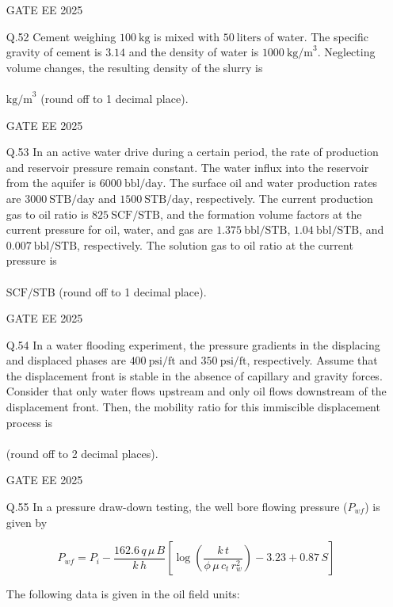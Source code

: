 \documentclass{article}
\begin{document}
\begin{enumerate}[leftmargin=*,series=q]
GATE EE 2025
\vspace{0.5cm}
\item[Q.52] Cement weighing $100 \ \text{kg}$ is mixed with $50 \ \text{liters}$ of water. The specific gravity of cement is $3.14$ and the density of water is $1000 \ \text{kg/m}^3$. Neglecting volume changes, the resulting density of the slurry is \\\\ $\text{kg/m}^3$ (round off to 1 decimal place).  

GATE EE 2025
\vspace{0.5cm}
\item[Q.53] In an active water drive during a certain period, the rate of production and reservoir pressure remain constant. The water influx into the reservoir from the aquifer is $6000 \ \text{bbl/day}$. The surface oil and water production rates are $3000 \ \text{STB/day}$ and $1500 \ \text{STB/day}$, respectively. The current production gas to oil ratio is $825 \ \text{SCF/STB}$, and the formation volume factors at the current pressure for oil, water, and gas are $1.375 \ \text{bbl/STB}$, $1.04 \ \text{bbl/STB}$, and $0.007 \ \text{bbl/STB}$, respectively. The solution gas to oil ratio at the current pressure is \\\\ $\text{SCF/STB}$ (round off to 1 decimal place).  

GATE EE 2025
\vspace{0.5cm}
\item[Q.54] In a water flooding experiment, the pressure gradients in the displacing and displaced phases are $400 \ \text{psi/ft}$ and $350 \ \text{psi/ft}$, respectively. Assume that the displacement front is stable in the absence of capillary and gravity forces. Consider that only water flows upstream and only oil flows downstream of the displacement front. Then, the mobility ratio for this immiscible displacement process is \\\\ (round off to 2 decimal places).  

GATE EE 2025
\vspace{0.5cm}
\item[Q.55] In a pressure draw-down testing, the well bore flowing pressure ($P_{wf}$) is given by  

\[
P_{wf} = P_{i} - \frac{162.6 \, q \, \mu \, B}{k \, h} \left[ \log \left( \frac{k \, t}{\phi \, \mu \, c_{t} \, r_{w}^{2}} \right) - 3.23 + 0.87 \, S \right]
\]

The following data is given in the oil field units:  


\end{enumerate}
\end{document}
